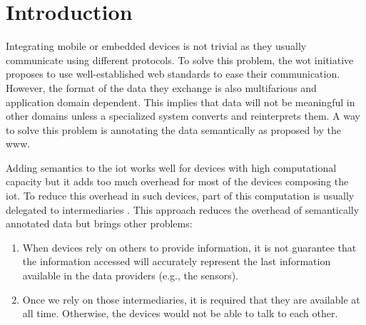 \section{Introduction}
\label{sec:search_intro}

% 

Integrating mobile or embedded devices is not trivial as they usually communicate using different protocols.
To solve this problem, the \acl{wot} initiative proposes to use well-established web standards to ease their communication.
However, the format of the data they exchange is also multifarious and application domain dependent.
This implies that data will not be meaningful in other domains unless a specialized system converts and reinterprets them.
A way to solve this problem is annotating the data semantically as proposed by the \ac{www}.

Adding semantics to the \ac{iot} works well for devices with high computational capacity but it adds too much overhead for most of the devices composing the \ac{iot}.
To reduce this overhead in such devices, part of this computation is usually delegated to intermediaries \citep{honkola_smart-m3_2010}.
This approach reduces the overhead of semantically annotated data but brings other problems:
\begin{enumerate}
  \item When devices rely on others to provide information, it is not guarantee that the information accessed will accurately represent the last information available in the data providers (e.g., the sensors).
  \item Once we rely on those intermediaries, it is required that they are available at all time.
	Otherwise, the devices would not be able to talk to each other.
\end{enumerate}

